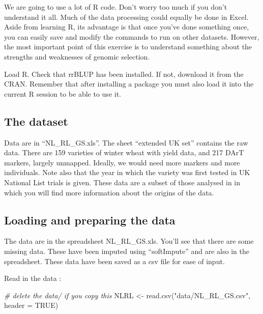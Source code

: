 \documentclass[
]{book}
\newenvironment{Shaded}{\begin{snugshade}}{\end{snugshade}}
\newcommand{\AttributeTok}[1]{\textcolor[rgb]{0.77,0.63,0.00}{#1}}
\newcommand{\CommentTok}[1]{\textcolor[rgb]{0.56,0.35,0.01}{\textit{#1}}}
\newcommand{\ConstantTok}[1]{\textcolor[rgb]{0.00,0.00,0.00}{#1}}
\newcommand{\FunctionTok}[1]{\textcolor[rgb]{0.00,0.00,0.00}{#1}}
\newcommand{\NormalTok}[1]{#1}
\newcommand{\OtherTok}[1]{\textcolor[rgb]{0.56,0.35,0.01}{#1}}
\newcommand{\StringTok}[1]{\textcolor[rgb]{0.31,0.60,0.02}{#1}}
\begin{document}
We are going to use a lot of R code. Don't worry too much if you don't understand it all. Much of the data processing could equally be done in Excel. Aside from learning R, its advantage is that once you've done something once, you can easily save and modify the commands to run on other datasets. However, the most important point of this exercise is to understand something about the strengths and weaknesses of genomic selection.

Load R. Check that rrBLUP has been installed. If not, download it from the CRAN. Remember that after installing a package you must also load it into the current R session to be able to use it.

\hypertarget{the-dataset}{%
\subsection{The dataset}\label{the-dataset}}

Data are in ``NL\_RL\_GS.xls''. The sheet ``extended UK set'' contains the raw data. There are 159
varieties of winter wheat with yield data, and 217 DArT markers, largely unmapped. Ideally,
we would need more markers and more individuals. Note also that the year in which the
variety was first tested in UK National List trials is given. These data are a subset of those analysed in \citet{Mackay2011} in which you will find more information about the origins of the data.

\hypertarget{loading-and-preparing-the-data}{%
\subsection{Loading and preparing the data}\label{loading-and-preparing-the-data}}

The data are in the spreadsheet NL\_RL\_GS.xls. You'll see that there are some missing data.
These have been imputed using ``softImpute'' and are also in the spreadsheet. These data have been saved as a csv file for ease of input.

Read in the data :

\begin{Shaded}
\begin{Highlighting}[]
\CommentTok{\# delete the \textquotesingle{}data/\textquotesingle{} if you copy this}
\NormalTok{NLRL }\OtherTok{\textless{}{-}} \FunctionTok{read.csv}\NormalTok{(}\StringTok{"data/NL\_RL\_GS.csv"}\NormalTok{, }\AttributeTok{header =} \ConstantTok{TRUE}\NormalTok{)}
\end{Highlighting}
\end{Shaded}
\end{document}
